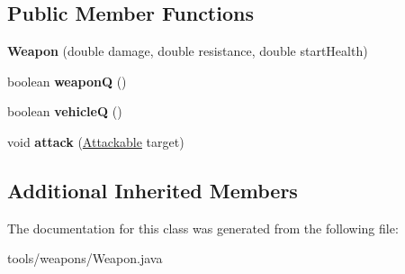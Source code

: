 \subsection*{Public Member Functions}
\begin{DoxyCompactItemize}
\item 
{\bfseries Weapon} (double damage, double resistance, double start\+Health)\hypertarget{classtools_1_1weapons_1_1_weapon_a21243dfd5e2fc8a8181d55596f7d979a}{}\label{classtools_1_1weapons_1_1_weapon_a21243dfd5e2fc8a8181d55596f7d979a}

\item 
boolean {\bfseries weaponQ} ()\hypertarget{classtools_1_1weapons_1_1_weapon_a84e27a7459b2c66589626d39408960f2}{}\label{classtools_1_1weapons_1_1_weapon_a84e27a7459b2c66589626d39408960f2}

\item 
boolean {\bfseries vehicleQ} ()\hypertarget{classtools_1_1weapons_1_1_weapon_af8f14a769b8fa4befc347e7c664a6b22}{}\label{classtools_1_1weapons_1_1_weapon_af8f14a769b8fa4befc347e7c664a6b22}

\item 
void {\bfseries attack} (\hyperlink{interfacetools_1_1weapons_1_1_attackable}{Attackable} target)\hypertarget{classtools_1_1weapons_1_1_weapon_a7b025e9a443897e93c81ad4327898bc2}{}\label{classtools_1_1weapons_1_1_weapon_a7b025e9a443897e93c81ad4327898bc2}

\end{DoxyCompactItemize}
\subsection*{Additional Inherited Members}


The documentation for this class was generated from the following file\+:\begin{DoxyCompactItemize}
\item 
tools/weapons/Weapon.\+java\end{DoxyCompactItemize}
